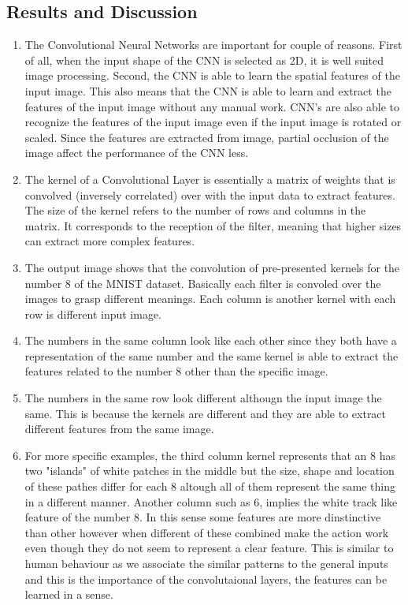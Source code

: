 \documentclass[3p,times,procedia]{elsarticle}
\begin{document}
\vspace{-0.5cm}
\subsection{\textbf{Results and Discussion}}
\begin{enumerate}
    \item The Convolutional Neural Networks are important for couple of reasons.
    First of all, when the input shape of the CNN is selected as 2D, it is well suited image processing.
    Second, the CNN is able to learn the spatial features of the input image. This also means that the CNN is able to learn and extract the features of the input image without any manual work.
    CNN's are also able to recognize the features of the input image even if the input image is rotated or scaled.
    Since the features are extracted from image, partial occlusion of the image affect the performance of the CNN less.
    \item The kernel of a Convolutional Layer  is essentially a matrix of weights that is convolved (inversely correlated) over with the input data to extract features.
    The size of the kernel refers to the number of rows and columns in the matrix. It corresponds to the reception of the filter, meaning that higher sizes can extract more complex features. 
    
    \item The output image shows that the convolution of pre-presented kernels for the number 8 of the MNIST dataset. Basically each filter is convoled over the images to grasp different meanings. Each column is another kernel with each row is different input image.
    
    \item The numbers in the same column look like each other since they both have a representation of the same number and the same kernel is able to extract the features related to the number 8 other than the specific image.
    
    \item The numbers in the same row look different althougn the input image the same. This is because the kernels are different and they are able to extract different features from the same image.
    
    \item For more specific examples, the third column kernel represents that an 8 has two "islands" of white patches in the middle but the size, shape and location of these pathes differ for each 8 altough all of them represent the same thing in a different manner.
     Another column such as 6, implies the white track like feature of the number 8. In this sense some features are more dinstinctive than other however when different of these combined make the action work even though they do not seem to represent a clear feature.
     This is similar to human behaviour as we associate the similar patterns to the general inputs and this is the importance of the convolutaional layers, the features can be learned in a sense.
\end{enumerate}
\end{document}
